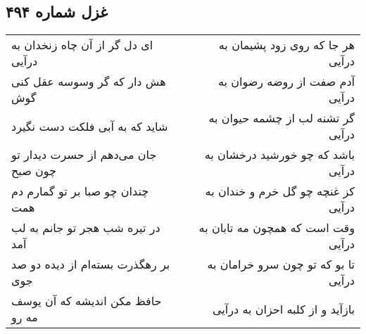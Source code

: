 \begin{center}
\section*{غزل شماره ۴۹۴}
\label{sec:sh494}
\begin{longtable}{l p{0.5cm} r}
ای دل گر از آن چاه زنخدان به درآیی
&&
هر جا که روی زود پشیمان به درآیی
\\
هش دار که گر وسوسه عقل کنی گوش
&&
آدم صفت از روضه رضوان به درآیی
\\
شاید که به آبی فلکت دست نگیرد
&&
گر تشنه لب از چشمه حیوان به درآیی
\\
جان می‌دهم از حسرت دیدار تو چون صبح
&&
باشد که چو خورشید درخشان به درآیی
\\
چندان چو صبا بر تو گمارم دم همت
&&
کز غنچه چو گل خرم و خندان به درآیی
\\
در تیره شب هجر تو جانم به لب آمد
&&
وقت است که همچون مه تابان به درآیی
\\
بر رهگذرت بسته‌ام از دیده دو صد جوی
&&
تا بو که تو چون سرو خرامان به درآیی
\\
حافظ مکن اندیشه که آن یوسف مه رو
&&
بازآید و از کلبه احزان به درآیی
\\
\end{longtable}
\end{center}
